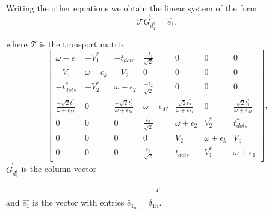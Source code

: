 \documentclass[showpacs,aps,prb,reprint,superscriptaddress]{revtex4-1}
\begin{document}
Writing the other equations  we obtain the  linear system of the form
\begin{equation}
    \mathcal{T} \vec{G}_{d^\dagger_1} = \hat{e_1},
\end{equation}

\noindent where $\mathcal{T}$ is the transport matrix 
\begin{equation}
\left[\begin{array}{ccccccc}
\omega-\epsilon_{1} & -V_{1}^{*} & -t_{dots} & \frac{-t_{1}}{\sqrt{2}} & 0 & 0 & 0\\
-V_{1} & \omega-\epsilon_{k} & -V_{2} & 0 & 0 & 0 & 0\\
-t_{dots}^{*} & -V_{2}^{*} & \omega-\epsilon_{2} & \frac{-t_{2}}{\sqrt{2}} & 0 & 0 & 0\\
\frac{-\sqrt{2}t_{1}^{*}}{\omega+\epsilon_{M}} & 0 & \frac{-\sqrt{2}t_{2}^{*}}{\omega+\epsilon_{M}} & \omega-\epsilon_{M} & \frac{\sqrt{2}t_{2}^{*}}{\omega+\epsilon_{M}} & 0 & \frac{\sqrt{2}t_{1}^{*}}{\omega+\epsilon_{M}}\\
0 & 0 & 0 & \frac{t_{2}}{\sqrt{2}} & \omega+\epsilon_{2} & V_{2}^{*} & t_{dots}^{*}\\
0 & 0 & 0 & 0 & V_{2} & \omega+\epsilon_{k} & V_{1}\\
0 & 0 & 0 & \frac{t_{1}}{\sqrt{2}} & t_{dots} & V_{1}^{*} & \omega+\epsilon_{1}
\end{array}\right],
\label{eq:TransportMatrix}
\end{equation}
 \noindent $\vec{G}_{d^\dagger_1}$  is the column vector
 
 \begin{align*}
    [ \Green{d_{\mathbf{1\downarrow}},d_{1\downarrow}^{\dagger}},&\Green{c_{k\downarrow},d_{1\downarrow}^{\dagger}},\Green{d_{2\downarrow},d_{1\downarrow}^{\dagger}},\Green{f_{\downarrow},  d_{1\downarrow}^{\dagger}}, \\ & \Green{d_{2\downarrow}^{\dagger},d_{1\downarrow}^{\dagger}},\Green{c_{k\downarrow}^{\dagger},d_{1\downarrow}^{\dagger}},\Green{d_{1\downarrow}^{\dagger},d_{1\downarrow}^{\dagger}} ]^T
 \end{align*}
and $\hat{e_1}$ is the vector with entries  $\hat{e}_{1_n} =\delta_{1n}$. 
\end{document}
